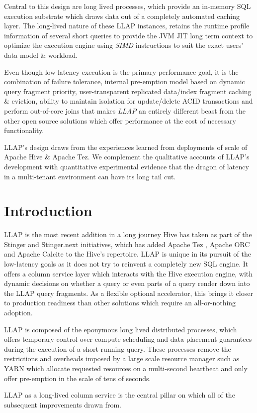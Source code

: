 
Central to this design are long lived processes, which provide an in-memory SQL execution substrate which draws
data out of a completely automated caching layer. The long-lived nature of these LLAP instances, retains the runtime profile
information of several short queries to provide the JVM JIT long term context to optimize the execution engine
using \emph{SIMD} instructions to suit the exact users' data model \& workload.


Even though low-latency execution is the primary performance goal, it is the combination of failure tolerance, 
internal pre-emption model based on dynamic query fragment priority, user-transparent replicated data/index fragment
caching \& eviction, ability to maintain isolation for update/delete ACID transactions and perform out-of-core joins 
that makes \emph{LLAP} an entirely different beast from the other open source solutions which offer performance at the cost
of necessary functionality.


LLAP's design draws from the experiences learned from deployments of scale of Apache Hive \& Apache Tez. We complement
the qualitative accounts of LLAP's development with quantitative experimental evidence that the dragon of latency in
a multi-tenant environment can have its long tail cut.


\section{Introduction}

LLAP is the most recent addition in a long journey Hive has taken as part of the Stinger and Stinger.next initiatives, which has added 
Apache Tez \cite{tez}, Apache ORC \cite{orc} and Apache Calcite \cite{cbo} to the Hive's repertoire.
LLAP is unique in its pursuit of the low-latency goals as it does not try to reinvent a completely new SQL engine. It offers a column service 
layer which interacts with the Hive execution engine, with dynamic decisions on whether a query or even parts of a query render down 
into the LLAP query fragments. As a flexible optional accelerator, this brings it closer to production readiness than other solutions
which require an all-or-nothing adoption. 

LLAP is composed of the eponymous long lived distributed processes, which offers temporary 
control over compute scheduling and data placement guarantees during the execution of a short running 
query. These processes remove the restrictions and overheads imposed by a large scale resource manager
such as YARN\cite{YARN} which allocate requested resources on a multi-second heartbeat and only offer
pre-emption in the scale of tens of seconds.

LLAP as a long-lived column service is the central pillar on which all of the subsequent improvements
drawn from. 
